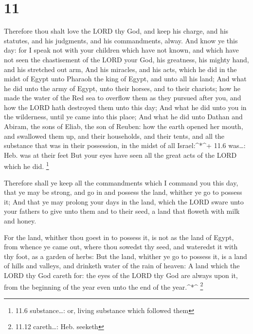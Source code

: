 \hypertarget{section-10}{%
\section{11}\label{section-10}}

 Therefore thou shalt love the LORD thy God, and keep his
charge, and his statutes, and his judgments, and his commandments,
alway.  And know ye this day: for I speak not with your
children which have not known, and which have not seen the chastisement
of the LORD your God, his greatness, his mighty hand, and his stretched
out arm,  And his miracles, and his acts, which he did in
the midst of Egypt unto Pharaoh the king of Egypt, and unto all his
land;  And what he did unto the army of Egypt, unto their
horses, and to their chariots; how he made the water of the Red sea to
overflow them as they pursued after you, and how the LORD hath destroyed
them unto this day;  And what he did unto you in the
wilderness, until ye came into this place;  And what he did
unto Dathan and Abiram, the sons of Eliab, the son of Reuben: how the
earth opened her mouth, and swallowed them up, and their households, and
their tents, and all the substance that was in their possession, in the
midst of all Israel:\^{}*\^{}+ 11.6 was\ldots: Heb. was at their feet
 But your eyes have seen all the great acts of the LORD
which he did. \footnote{11.6 substance\ldots: or, living substance which
  followed them}

 Therefore shall ye keep all the commandments which I
command you this day, that ye may be strong, and go in and possess the
land, whither ye go to possess it;  And that ye may prolong
your days in the land, which the LORD sware unto your fathers to give
unto them and to their seed, a land that floweth with milk and honey.

 For the land, whither thou goest in to possess it, is not
as the land of Egypt, from whence ye came out, where thou sowedst thy
seed, and wateredst it with thy foot, as a garden of herbs:
 But the land, whither ye go to possess it, is a land of
hills and valleys, and drinketh water of the rain of heaven:
 A land which the LORD thy God careth for: the eyes of the
LORD thy God are always upon it, from the beginning of the year even
unto the end of the year.\^{}*\^{} \footnote{11.12 careth\ldots: Heb.
  seeketh}

